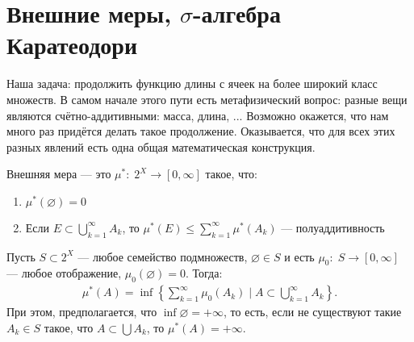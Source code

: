 
\section{Внешние меры, \texorpdfstring{$\sigma$}{sigma}-алгебра Каратеодори}

Наша задача: продолжить функцию длины с ячеек на более широкий класс множеств. В самом начале этого пути есть метафизический вопрос: разные вещи являются счётно-аддитивными: масса, длина, ... Возможно окажется, что нам много раз придётся делать такое продолжение. Оказывается, что для всех этих разных явлений есть одна общая математическая конструкция.

\begin{df}
 Внешняя мера --- это $ \mu^\ast \colon\; 2^X \to [0, \infty] $ такое, что:
 \begin{enumerate}
  \item $ \mu^\ast(\varnothing) = 0 $
  \item Если $ E \subset \displaystyle \bigcup_{k=1}^\infty A_k $, то $ \displaystyle \mu^\ast\left( E \right) \leqslant \sum_{k=1}^\infty \mu^\ast(A_k) $ --- полуаддитивность
 \end{enumerate}
\end{df}
\begin{exmpl}
 Пусть $ S \subset 2^X $ --- любое семейство подмножеств, $ \varnothing \in S $ и есть $ \mu_0 \colon\; S \to [0, \infty] $ --- любое отображение, $ \mu_0(\varnothing) = 0 $. Тогда:
 \begin{align*}
  \mu^\ast(A) = \inf \left\{ \sum_{k=1}^\infty \mu_0(A_k) \mid A \subset \bigcup_{k=1}^\infty A_k  \right\} 
 .\end{align*} При этом, предполагается, что $ \inf \varnothing = +\infty $, то есть, если не существуют такие $ A_k \in S $ такое, что $ A \subset \bigcup A_k $, то $ \mu^\ast (A) = +\infty $.
\end{exmpl}
